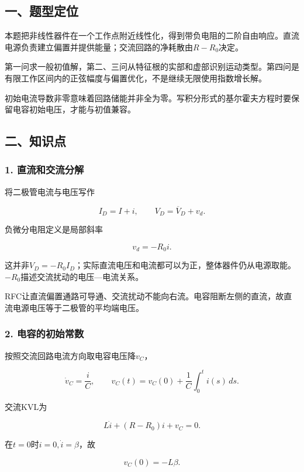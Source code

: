 \documentclass[12pt,a4paper,fontset=fandol]{ctexart}
\begin{document}
\subsection{一、题型定位}\label{ux4e00ux9898ux578bux5b9aux4f4d-2}

本题把非线性器件在一个工作点附近线性化，得到带负电阻的二阶自由响应。直流电源负责建立偏置并提供能量；交流回路的净耗散由\(R-R_0\)决定。

第一问求一般初值解，第二、三问从特征根的实部和虚部识别运动类型。第四问是有限工作区间内的正弦幅度与偏置优化，不是继续无限使用指数增长解。

初始电流导数非零意味着回路储能并非全为零。写积分形式的基尔霍夫方程时要保留电容初始电压，才能与初值兼容。

\subsection{二、知识点}\label{ux4e8cux77e5ux8bc6ux70b9-2}

\subsubsection{1.
直流和交流分解}\label{ux76f4ux6d41ux548cux4ea4ux6d41ux5206ux89e3}

将二极管电流与电压写作

\[
I_D=I+i,\qquad V_D=\overline V_D+v_d.
\]

负微分电阻定义是局部斜率

\[
v_d=-R_0i.
\]

这并非\(V_D=-R_0I_D\)；实际直流电压和电流都可以为正，整体器件仍从电源取能。\(-R_0\)描述交流扰动的电压---电流关系。

RFC让直流偏置通路可导通、交流扰动不能向右流。电容阻断左侧的直流，故直流电源电压等于二极管的平均端电压。

\subsubsection{2.
电容的初始常数}\label{ux7535ux5bb9ux7684ux521dux59cbux5e38ux6570}

按照交流回路电流方向取电容电压降\(v_C\)，

\[
\dot v_C=\frac{i}{C},
\qquad
v_C(t)=v_C(0)+\frac1C\int_0^ti(s)\,ds.
\]

交流KVL为

\[
L\dot i+(R-R_0)i+v_C=0.
\]

在\(t=0\)时\(i=0,\dot i=\beta\)，故

\[
\boxed{v_C(0)=-L\beta}.
\]
\end{document}
